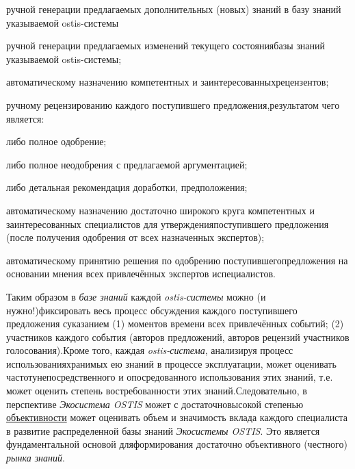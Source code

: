 \begin{scnsubstruct}
{        \begin{scnitemize}
            \item ручной генерации предлагаемых дополнительных (новых) знаний в базу знаний указываемой \mbox{ostis-системы}
            \item ручной генерации предлагаемых изменений текущего состояниябазы знаний указываемой ostis-системы;
            \item автоматическому назначению компетентных и заинтересованныхрецензентов;
            \item ручному рецензированию каждого поступившего предложения,результатом чего является:
            \begin{scnitemizeii}
                \item либо полное одобрение;
                \item либо полное неодобрения с предлагаемой аргументацией;
                \item либо детальная рекомендация доработки, предположения;
            \end{scnitemizeii}
            \item автоматическому назначению достаточно широкого круга компетентных и заинтересованных специалистов для утвержденияпоступившего предложения (после получения одобрения от всех назначенных экспертов);
            \item автоматическому принятию решения по одобрению поступившегопредложения на основании мнения всех привлечённых экспертов испециалистов.
        \end{scnitemize}
        Таким образом в \textit{базе знаний} каждой \textit{ostis-системы} можно (и нужно!)фиксировать весь процесс обсуждения каждого поступившего предложения суказанием (1) моментов времени всех привлечённых событий; (2) участников каждого события (авторов предложений, авторов рецензий участников голосования).Кроме того, каждая \textit{ostis-система}, анализируя процесс использованияхранимых ею знаний в процессе эксплуатации, может оценивать частотунепосредственного и опосредованного использования этих знаний, т.е. может оценить степень востребованности этих знаний.Следовательно, в перспективе \textit{Экосистема OSTIS} может с достаточновысокой степенью \uline{объективности} может оценивать объем и значимость вклада каждого специалиста в развитие распределенной базы знаний \textit{Экосистемы OSTIS}. Это является фундаментальной основой дляформирования достаточно объективного (честного) \textit{рынка знаний}.}

\end{scnsubstruct}
